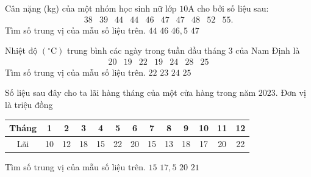 \begin{ex}%
Cân nặng (kg) của một nhóm học sinh nữ lớp $10$A cho bởi số liệu sau:
$$
\begin{array}{llllllllll}
38 & 39 & 44 & 44 & 46 & 47 & 47 & 48 & 52 & 55.
\end{array}
$$
Tìm số trung vị của mẫu số liệu trên.
\choice
{$44$}
{$46$}
{\True $46{,}5$}
{$47$}
\end{ex}

\begin{ex}%
Nhiệt độ $\left({}^{\circ}\mathrm{C}\right)$ trung bình các ngày trong tuần đầu tháng $3$ của Nam Định là
$$
\begin{array}{lllllll}
20 & 19 & 22 & 19 & 24 & 28 & 25
\end{array}
$$
Tìm số trung vị của mẫu số liệu trên.
\choice
{\True $22$}
{$23$}
{$24$}
{$25$}
\end{ex}

\begin{ex}%
Số liệu sau đây cho ta lãi hàng tháng của một cửa hàng trong năm $2023$. Đơn vị là triệu đồng
\begin{center}
\begin{tabular}{|c|c|c|c|c|c|c|c|c|c|c|c|c|}
\hline Tháng & 1 & 2 & 3 & 4 & 5 & 6 & 7 & 8 & 9 & 10 & 11 & 12 \\
\hline Lãi & 10 & 12 & 18 & 15 & 22 & 20 & 15 & 13 & 18 & 17 & 20 & 22 \\
\hline
\end{tabular}
\end{center}
Tìm số trung vị của mẫu số liệu trên.
\choice
{$15$}
{\True $17{,}5$}
{$20$}
{$21$}
\end{ex}

